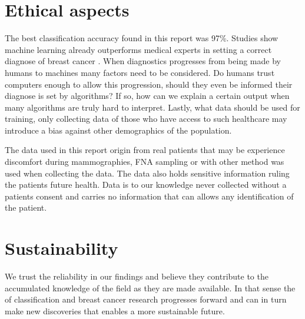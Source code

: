 \section{Ethical aspects}

The best classification accuracy found in this report was 97\%. Studies show machine learning already outperforms medical experts in setting a correct diagnose of breast cancer \parencite{fnab}. When diagnostics progresses from being made by humans to machines many factors need to be considered. Do humans trust computers enough to allow this progression, should they even be informed their diagnose is set by algorithms? If so, how can we explain a certain output when many algorithms are truly hard to interpret. Lastly, what data should be used for training, only collecting data of those who have access to such healthcare may introduce a bias against other demographics of the population.

The data used in this report origin from real patients that may be experience discomfort during mammographies, FNA sampling or with other method was used when collecting the data. The data also holds sensitive information ruling the patients future health. Data is to our knowledge never collected without a patients consent and carries no information that can allows any identification of the patient.

\section{Sustainability}

We trust the reliability in our findings and believe they contribute to the accumulated knowledge of the field as they are made available. In that sense the of classification and breast cancer research progresses forward and can in turn make new discoveries that enables a more sustainable future.
